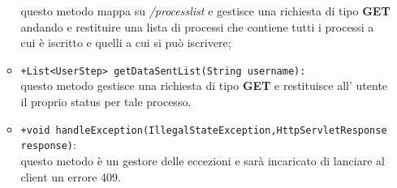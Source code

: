 \begin{itemize}
\begin{itemize}
					questo metodo mappa su \textit{\slash processlist} e gestisce una richiesta di tipo \textbf{GET} andando e restituire una lista di processi che contiene tutti i processi  a cui è iscritto e quelli a cui si può iscrivere;
					\item \texttt{+List<UserStep> getDataSentList(String username):}\\
					questo metodo gestisce una richiesta di tipo \textbf{GET} e restituisce all' utente il proprio status per tale processo.
					\item \texttt{+void handleException(IllegalStateException,HttpServletResponse response)}:\\
					 questo metodo è un gestore delle eccezioni e sarà incaricato di lanciare al client un errore 409.
				\end{itemize}
\end{itemize}
